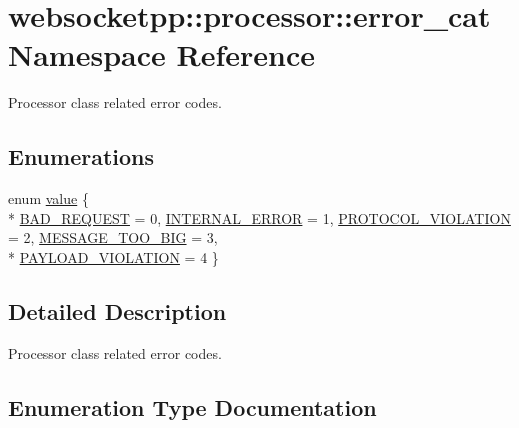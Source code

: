 \hypertarget{namespacewebsocketpp_1_1processor_1_1error__cat}{}\section{websocketpp\+:\+:processor\+:\+:error\+\_\+cat Namespace Reference}
\label{namespacewebsocketpp_1_1processor_1_1error__cat}


Processor class related error codes.  


\subsection*{Enumerations}
\begin{DoxyCompactItemize}
\item 
enum \hyperlink{namespacewebsocketpp_1_1processor_1_1error__cat_ae83487c9a0c1462b790898dfcb4b174e}{value} \{ \\*
\hyperlink{namespacewebsocketpp_1_1processor_1_1error__cat_ae83487c9a0c1462b790898dfcb4b174eac0697fdb05431e5c4521e56923722bef}{B\+A\+D\+\_\+\+R\+E\+Q\+U\+E\+S\+T} = 0, 
\hyperlink{namespacewebsocketpp_1_1processor_1_1error__cat_ae83487c9a0c1462b790898dfcb4b174ea56a41bab646bdc8740ac51e800001e48}{I\+N\+T\+E\+R\+N\+A\+L\+\_\+\+E\+R\+R\+O\+R} = 1, 
\hyperlink{namespacewebsocketpp_1_1processor_1_1error__cat_ae83487c9a0c1462b790898dfcb4b174ea1a3d790446746332fa75c52739ab005a}{P\+R\+O\+T\+O\+C\+O\+L\+\_\+\+V\+I\+O\+L\+A\+T\+I\+O\+N} = 2, 
\hyperlink{namespacewebsocketpp_1_1processor_1_1error__cat_ae83487c9a0c1462b790898dfcb4b174ea0a6c802c67bb7e8d93f8d06cb7c5fe7b}{M\+E\+S\+S\+A\+G\+E\+\_\+\+T\+O\+O\+\_\+\+B\+I\+G} = 3, 
\\*
\hyperlink{namespacewebsocketpp_1_1processor_1_1error__cat_ae83487c9a0c1462b790898dfcb4b174ea7bb0c4de0970cfe712b999c4e7291429}{P\+A\+Y\+L\+O\+A\+D\+\_\+\+V\+I\+O\+L\+A\+T\+I\+O\+N} = 4
 \}
\end{DoxyCompactItemize}


\subsection{Detailed Description}
Processor class related error codes. 

\subsection{Enumeration Type Documentation}
\hypertarget{namespacewebsocketpp_1_1processor_1_1error__cat_ae83487c9a0c1462b790898dfcb4b174e}{}
